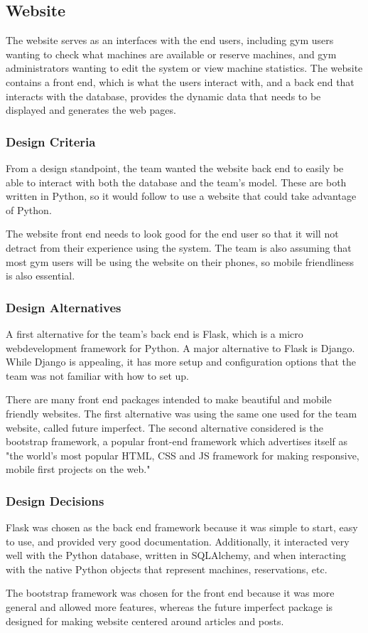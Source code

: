 \documentclass[PPFS.tex]{template/subfiles}
\begin{document}
\subsection{Website}
The website serves as an interfaces with the end users, including gym users wanting to check what machines are available or reserve machines, and gym administrators wanting to edit the system or view machine statistics.
The website contains a front end, which is what the users interact with, and a back end that interacts with the database, provides the dynamic data that needs to be displayed and generates the web pages. 

\subsubsection{Design Criteria}
From a design standpoint, the team wanted the website back end to easily be able to interact with both the database and the team's model. These are both written in Python, so it would follow to use a website that could take advantage of Python.

The website front end needs to look good for the end user so that it will not detract from their experience using the system. The team is also assuming that most gym users will be using the website on their phones, so mobile friendliness is also essential.

\subsubsection{Design Alternatives}
A first alternative for the team's back end is Flask, which is a micro webdevelopment framework for Python.
A major alternative to Flask is Django. While Django is appealing, it has more setup and configuration options that the team was not familiar with how to set up.

There are many front end packages intended to make beautiful and mobile friendly websites. The first alternative was using the same one used for the team website, called future imperfect. The second alternative considered is the bootstrap framework, a popular front-end framework which advertises itself as "the world's most popular HTML, CSS and JS framework for making responsive, mobile first projects on the web."

\subsubsection{Design Decisions}
Flask was chosen as the back end framework because it was simple to start, easy to use, and provided very good documentation. Additionally, it interacted very well with the Python database, written in SQLAlchemy, and when interacting with the native Python objects that represent machines, reservations, etc.

The bootstrap framework was chosen for the front end because it was more general and allowed more features, whereas the future imperfect package is designed for making website centered around articles and posts.
\end{document}
